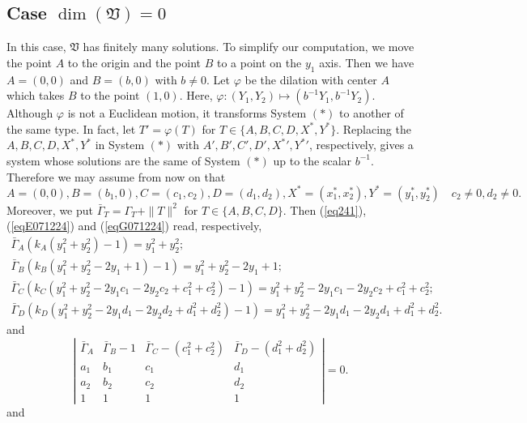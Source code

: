 \documentclass[10pt]{amsart}
\theoremstyle{definition}
\theoremstyle{remark}
\begin{document}
\subsection{Case $\dim(\mathfrak{V})=0$} In this case, $\mathfrak{V}$ has finitely many solutions. To simplify our computation, we move the point $A$ to the origin and the point $B$ to a point on the $y_1$ axis. Then we have $A=(0,0)$ and $B=(b,0)$ with $b\ne 0$. Let $\varphi$ be the dilation with center $A$ which takes $B$ to the point $(1,0)$. Here, $\varphi: (Y_1,Y_2)\mapsto (b^{-1}Y_1,b^{-1}Y_2)$. Although $\varphi$ is not a Euclidean motion, it transforms System $(*)$ to another of the same type. In fact, let $T'=\varphi(T)$ for $T\in \{A,B,C,D,X^*,Y^*\}$. Replacing the $A,B,C,D,X^*,Y^*$ in System $(*)$ with $A',B',C',D',{X^*}',{Y^*}'$, respectively, gives a system whose solutions are the same of System $(*)$ up to the scalar $b^{-1}$.  Therefore we may assume from now on that $$A=(0,0),B=(b_1,0),C=(c_1,c_2),D=(d_1,d_2),X^*=(x_1^*,x_2^*),Y^*=(y_1^*,y_2^*)\quad c_2\ne 0,d_2\ne 0.$$
Moreover, we put $\bar{\Gamma}_T=\Gamma_T+\|T\|^2$ for $T\in \{A,B,C,D\}.$
Then (\ref{eq241}), (\ref{eqE071224}) and (\ref{eqG071224}) read, respectively,
\begin{equation}
\label{eq081224A}
\begin{array}{lll}
\bar{\Gamma}_A (k_A(y_1^2+y_2^2)-1)=y_1^2+y_2^2;\\
\bar{\Gamma}_B (k_B(y_1^2+y_2^2-2y_1+1)-1)= y_1^2+y_2^2-2y_1+1;\\
\bar{\Gamma}_C (k_C(y_1^2+y_2^2-2y_1c_1-2y_2c_2+c_1^2+c_2^2)-1)= y_1^2+y_2^2-2y_1c_1-2y_2c_2+c_1^2+c_2^2;\\
\bar{\Gamma}_D (k_D(y_1^2+y_2^2-2y_1d_1-2y_2d_2+d_1^2+d_2^2)-1)=y_1^2+y_2^2-2y_1d_1-2y_2d_1+d_1^2+d_2^2.
\end{array}
\end{equation}
and
\begin{equation}
\label{eqEB1071224}
\left| \begin{array}{cccccc}
  \bar{\Gamma}_A & \bar{\Gamma}_B-1& \bar{\Gamma}_C-(c_1^2+c_2^2) & \bar{\Gamma}_D-(d_1^2+d_2^2) \\
  a_1 & b_1 & c_1 & d_1  \\
  a_2 & b_2 & c_2 & d_2  \\
  1 & 1 & 1 & 1
\end{array}\right|=0.
\end{equation}
and
\end{document}
